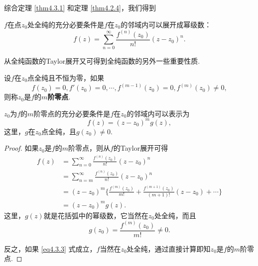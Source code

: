 综合定理 \ref{thm4.3.1} 和定理 \ref{thm4.2.4}，我们得到
\begin{theorem}\label{thm4.3.2}
$f$在点$z_0$处全纯的充分必要条件是$f$在$z_0$的邻域内可以展开成幂级数：
\begin{equation*}
f(z)=\sum_{n=0}^\infty \frac{f^{(n)}(z_0)}{n!}(z-z_0)^n.
\end{equation*}
\end{theorem}

从全纯函数的Taylor展开又可得到全纯函数的另外一些重要性质.

\begin{definition}\label{def4.3.3}
  设$f$在$z_0$点全纯且不恒为零，如果
  \[f(z_0)=0,f'(z_0)=0,\cdots,f^{(m-1)}(z_0)=0,f^{(m)}(z_0)\ne0,\]
则称$z_0$是$f$的\textbf{$m$阶零点}.
\end{definition}
\begin{prop}\label{prop4.3.4}
$z_0$为$f$的$m$阶零点的充分必要条件是$f$在$z_0$的邻域内可以表示为
\begin{equation}\label{eq4.3.3}
f(z)=(z-z_0)^mg(z),
\end{equation}
这里，$g$在$z_0$点全纯，且$g(z_0)\ne0$.
\end{prop}
\begin{proof}
如果$z_0$是$f$的$m$阶零点，则从$f$的Taylor展开可得
\begin{align*}
f(z)&=\sum_{n=0}^\infty \frac{f^{(n)}(z_0)}{n!}(z-z_0)^n\\
&=\sum_{n=m}^\infty \frac{f^{(n)}(z_0)}{n!}(z-z_0)^n\\
&=(z-z_0)^m\bigg\{\frac{f^{(m)}(z_0)}{m!}+\frac{f^{(m+1)}(z_0)}{(m+1)!}
(z-z_0)+\cdots\bigg\}\\
&=(z-z_0)^mg(z).
\end{align*}
这里，$g(z)$就是花括弧中的幂级数，它当然在$z_0$处全纯，而且
\[g(z_0)=\frac{f^{(m)}(z_0)}{m!}\ne0.\]

反之，如果 \eqref{eq4.3.3} 式成立，$f$当然在$z_0$处全纯，通过直接计算即知$z_0$是$f$的$m$阶零点.
\end{proof}


